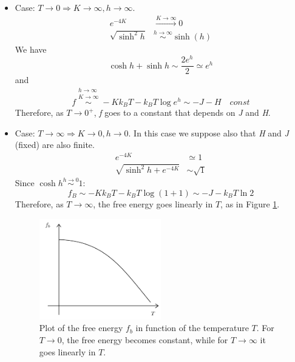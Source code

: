 \documentclass[../../Main/Main.tex]{subfiles}
\begin{document}
\begin{itemize}
\item Case: \( T \rightarrow 0  \Rightarrow K \rightarrow \infty , h \rightarrow \infty  \).
\begin{subequations}
\begin{align*}
  e^{-4K} & \overset{K \rightarrow \infty }{\longrightarrow} 0  \\
  \sqrt{\sinh^2 h} & \overset{h \rightarrow \infty }{\sim } \sinh (h)
\end{align*}
\end{subequations}
We have 
\begin{equation*}
\cosh h + \sinh h \sim \frac{2 e^{h} }{2} \simeq e^{h}
\end{equation*}
and
\begin{equation}
  f \overset{\substack{h \rightarrow \infty  \\ K \rightarrow \infty  } }{\sim } - K k_B T - k_B T \log{e^{h} } \sim -J -H \quad const
\end{equation}
Therefore, as \( T \rightarrow 0^+ \), \emph{f} goes to a constant that depends on \emph{J} and \emph{H}.

\item  Case: \( T \rightarrow \infty   \Rightarrow K \rightarrow 0 , h \rightarrow 0  \).
In this case we suppose also that \emph{H} and \emph{J} (fixed) are also finite.
\begin{subequations}
\begin{align*}
  e^{-4K} & \simeq 1  \\
  \sqrt{\sinh^2 h + e^{-4K} } & \sim \sqrt{1}
\end{align*}
\end{subequations}
Since \( \cosh h \overset{h \rightarrow 0}{\sim } 1  \):
\begin{equation}
  f_B \sim  -K k_B T - k_B T \log{(1+1)} \sim  -J -k_B T \ln{2}
\end{equation}
Therefore, as \( T \rightarrow \infty  \), the free energy goes linearly in $T$, as in Figure \ref{fig:8_1}.


\begin{figure}[H]
\centering
\includegraphics[width=0.5\textwidth]{./img/1.pdf}
\caption{\label{fig:8_1} Plot of the free energy \( f_b \) in function of the temperature \( T \). For \( T \rightarrow 0 \), the free energy becomes constant, while for \( T \rightarrow \infty  \) it goes linearly in $T$.  }
\end{figure}
\end{itemize}
\end{document}
